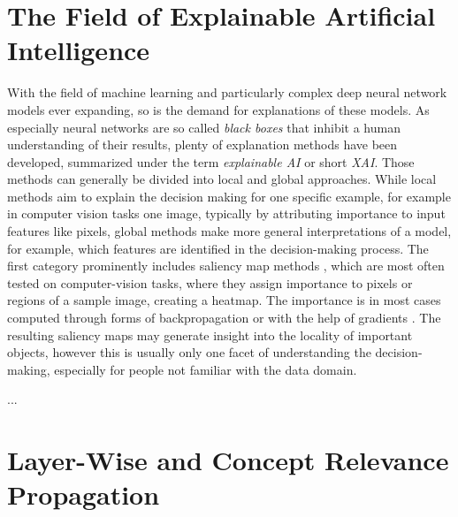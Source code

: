\section{The Field of Explainable Artificial Intelligence}
With the field of machine learning and particularly complex deep neural network models ever expanding, so is the demand for explanations of these models.
As especially neural networks are so called \textit{black boxes} that inhibit a human understanding of their results, plenty of explanation methods have been developed, summarized under the term \textit{explainable AI} or short \textit{XAI}. 
Those methods can generally be divided into local and global approaches. While local methods aim to explain the decision making for one specific example, for example in computer vision tasks one image, typically by attributing importance to input features like pixels, global methods make more general interpretations of a model, for example, which features are identified in the decision-making process. The first category prominently includes saliency map methods , which are most often tested on computer-vision tasks, where they assign importance to pixels or regions of a sample image, creating a heatmap. The importance is in most cases computed through forms of backpropagation  or with the help of gradients . The resulting saliency maps may generate insight into the locality of important objects, however this is usually only one facet of understanding the decision-making, especially for people not familiar with the data domain.

...



\section{Layer-Wise and Concept Relevance Propagation}


